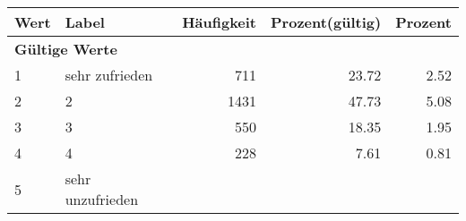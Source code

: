      \begin{longtable}{lXrrr}
     \toprule
     \textbf{Wert} & \textbf{Label} & \textbf{Häufigkeit} & \textbf{Prozent(gültig)} & \textbf{Prozent} \\
     \endhead
     \midrule
     \multicolumn{5}{l}{\textbf{Gültige Werte}}\\

     1 &
     \multicolumn{1}{X}{ sehr zufrieden   } &


       \num{711} &
       \num[round-mode=places,round-precision=2]{23.72} &
         \num[round-mode=places,round-precision=2]{2.52} \\

     2 &
     \multicolumn{1}{X}{ 2   } &


       \num{1431} &
       \num[round-mode=places,round-precision=2]{47.73} &
         \num[round-mode=places,round-precision=2]{5.08} \\

     3 &
     \multicolumn{1}{X}{ 3   } &


       \num{550} &
       \num[round-mode=places,round-precision=2]{18.35} &
         \num[round-mode=places,round-precision=2]{1.95} \\

     4 &
     \multicolumn{1}{X}{ 4   } &


       \num{228} &
       \num[round-mode=places,round-precision=2]{7.61} &
         \num[round-mode=places,round-precision=2]{0.81} \\

     5 &
     \multicolumn{1}{X}{ sehr unzufrieden   } &



\end{longtable}
